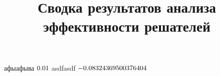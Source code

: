 \documentclass[%
	11pt,
	a4paper,
	utf8,
		]{article}
\begin{document}
\title{Сводка результатов анализа эффективности решателей}


\date{}
\maketitle

\thispagestyle{fancy}




\newcommand\cplexObj{1.2286400825e+07}
\newcommand\zyoptObj{1.2285012e+07}
\newcommand\highsObj{1.2296637e+07}
\newcommand\cplexZyoptObjRel{(\fpeval{\cplexObj} - \fpeval{\zyoptObj}) / \fpeval{\cplexObj} * 100}
\newcommand\cplexHighsObjRel{(\fpeval{\cplexObj} - \fpeval{\highsObj}) / \fpeval{\highsObj} * 100}


афыафыва $ \fpeval{trunc(\cplexZyoptObjRel, 2)} $
asdfasdf $ \fpeval{\cplexHighsObjRel} $
\end{document}
